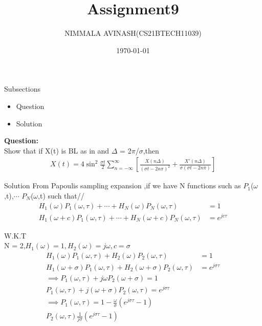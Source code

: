 \documentclass{beamer}
\title{Assignment9}
\author{NIMMALA AVINASH(CS21BTECH11039)}
\institute{IITH}
\date{\today}
\begin{document}
\begin{large}
\maketitle
\begin{frame}{Subsections}
\begin{itemize}
\item Question
\item Solution
\end{itemize}
\end{frame}
\begin{frame}
{\LARGE \textbf{Question:\\}}
Show that if X(t) is BL as in and $\Delta$ = 2$\pi$/$\sigma$,then\\
\begin{align}
X(t) = 4 \sin^{2}{\frac{\sigma t}{2}} \sum_{n=-\infty}^{\infty}[\frac{X(n\Delta)}{(\sigma t - 2n\pi)^{2}} + \frac{X'(n\Delta)}{\sigma(\sigma t - 2n\pi)}]
\end{align}
\end{frame}
\begin{frame}{Solution}
    From Papoulis sampling expansion ,if we have N functions such as $P_{1}$($ \omega $,t),$ \cdots $ $P_{N}$($ \omega $,t) such that//
\begin{align}
H_{1}(\omega)P_{1}(\omega,\tau)+\cdots +H_{N}(\omega)P_{N}(\omega,\tau) &= 1\\
H_{1}(\omega+c)P_{1}(\omega,\tau)+\cdots +H_{N}(\omega+c)P_{N}(\omega,\tau) &= e^{jc\tau}
\end{align}
\end{frame}
\begin{frame}
W.K.T \\
N = 2,$H_{1}(\omega) = 1,H_{2}(\omega) = j\omega,c = \sigma$
\begin{align}
H_{1}(\omega)P_{1}(\omega,\tau)+H_{2}(\omega)P_{2}(\omega,\tau) &= 1\\
H_{1}(\omega+\sigma)P_{1}(\omega,\tau)+H_{2}(\omega+\sigma)P_{2}(\omega,\tau)&= e^{j\sigma\tau}\\
\implies P_{1}(\omega ,\tau) + j\omega P_{2}(\omega + \sigma) = 1\\
P_{1}(\omega,\tau)+j(\omega+\sigma)P_{2}(\omega,\tau) = e^{j\sigma\tau}\\
\implies P_{1}(\omega,\tau) = 1 - \frac{\omega}{\sigma}(e^{j\sigma\tau}-1)\\
P_{2}(\omega,\tau)  \frac{1}{j\sigma}(e^{j\sigma\tau}-1)\\
\end{align}

\end{frame}
\end{large}
\end{document}

